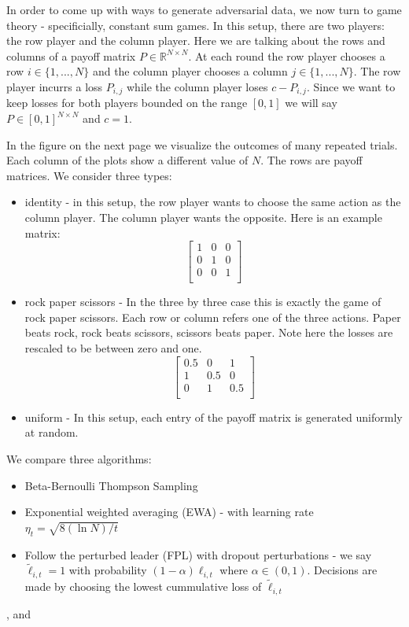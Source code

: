 \documentclass[10pt,a4paper]{article} %
\begin{document}
	In order to come up with ways to generate adversarial data, we now turn to game theory - specificially, constant sum games.  In this setup, there are two players: the row player and the column player.  Here we are talking about the rows and columns of a payoff matrix $P \in \mathds{R}^{N \times N}$.  At each round the row player chooses a row $i \in \{1, ..., N\}$ and the column player chooses a column $j \in \{1, ..., N\}$.  The row player incurrs a loss $P_{i, j}$ while the column player loses $c - P_{i, j}$.  Since we want to keep losses for both players bounded on the range $\left[ 0, 1 \right] $ we will say $P \in \left[ 0, 1 \right] ^{N \times N}$ and $c = 1$.
		
	In the figure on the next page we visualize the outcomes of many repeated trials.  Each column of the plots show a different value of $N$.  The rows are payoff matrices.  We consider three types: 
	\begin{itemize}
		\item identity - in this setup, the row player wants to choose the same action as the column player.  The column player wants the opposite.  Here is an example matrix:
		$$
		\begin{bmatrix}
			1  &  0 & 0     \\
			0  &  1 & 0     \\
			0  &  0 & 1     \\
		\end{bmatrix}
		$$
		\item rock paper scissors - In the three by three case this is exactly the game of rock paper scissors.  Each row or column refers one of the three actions.  Paper beats rock, rock beats scissors, scissors beats paper.  Note here the losses are rescaled to be between zero and one.
		$$
		\begin{bmatrix}
			0.5  &  0 & 1     \\
			1  &  0.5 & 0     \\
			0  &  1  & 0.5    \\
		\end{bmatrix}
		$$
		\item uniform - In this setup, each entry of the payoff matrix is generated uniformly at random.
	\end{itemize}
	We compare three algorithms: 
	\begin{itemize}
		\item Beta-Bernoulli Thompson Sampling
		\item Exponential weighted averaging (EWA) - with learning rate $\eta_t = \sqrt{8 (\ln{N})/t}$
		\item Follow the perturbed leader (FPL) with dropout perturbations -  we say $\widetilde{\ell}_{i, t} = 1$ with probability $(1 - \alpha) \ell_{i, t}$ where $\alpha \in (0, 1)$.  Decisions are made by choosing the lowest cummulative loss of $\widetilde{\ell}_{i, t}$
	\end{itemize},  and 
\end{document}
